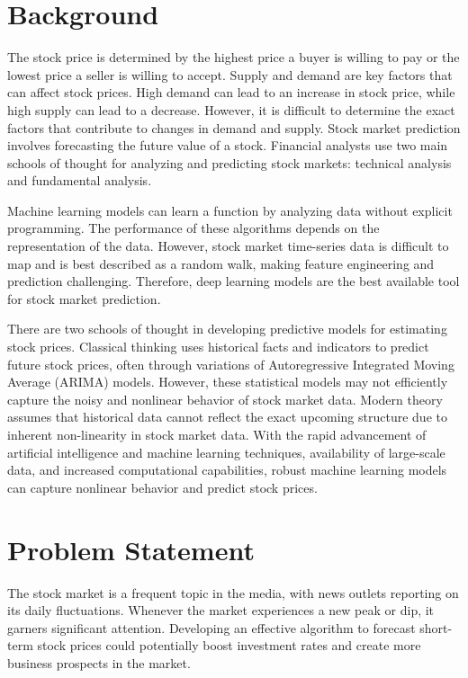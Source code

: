 \section{Background}\label{sec:bkgrnd}%
\vspace{-18pt}
The stock price is determined by the highest price a buyer is willing to pay or the lowest price a seller is willing to accept. Supply and demand are key factors that can affect stock prices. High demand can lead to an increase in stock price, while high supply can lead to a decrease. However, it is difficult to determine the exact factors that contribute to changes in demand and supply. Stock market prediction involves forecasting the future value of a stock. Financial analysts use two main schools of thought for analyzing and predicting stock markets: technical analysis and fundamental analysis. \cite{}%
\par
 Machine learning models can learn a function by analyzing data without explicit programming. The performance of these algorithms depends on the representation of the data. However, stock market time-series data is difficult to map and is best described as a random walk, making feature engineering and prediction challenging. Therefore, deep learning models are the best available tool for stock market prediction.\cite{}%
 \par
 There are two schools of thought in developing predictive models for estimating stock prices. Classical thinking uses historical facts and indicators to predict future stock prices, often through variations of Autoregressive Integrated Moving Average (ARIMA) models. However, these statistical models may not efficiently capture the noisy and nonlinear behavior of stock market data. Modern theory assumes that historical data cannot reflect the exact upcoming structure due to inherent non-linearity in stock market data. With the rapid advancement of artificial intelligence and machine learning techniques, availability of large-scale data, and increased computational capabilities, robust machine learning models can capture nonlinear behavior and predict stock prices.\cite{}%

\section{Problem Statement}
\vspace{-18pt}
The stock market is a frequent topic in the media, with news outlets reporting on its daily fluctuations. Whenever the market experiences a new peak or dip, it garners significant attention. Developing an effective algorithm to forecast short-term stock prices could potentially boost investment rates and create more business prospects in the market.

